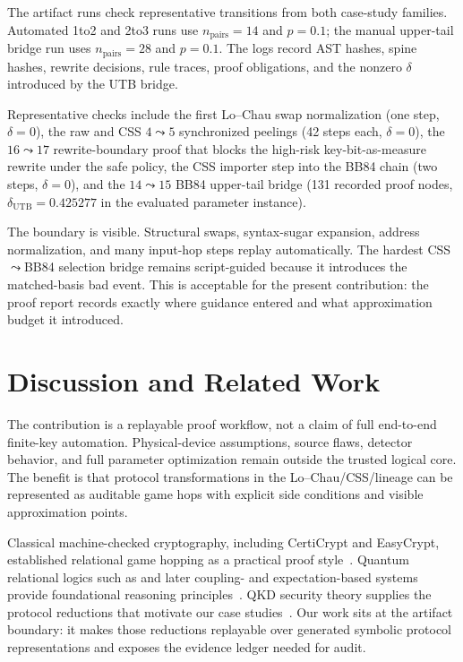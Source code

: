 The artifact runs check representative transitions from both case-study families. Automated 1to2 and 2to3 runs use $n_{\mathrm{pairs}}=14$ and $p=0.1$; the manual upper-tail bridge run uses $n_{\mathrm{pairs}}=28$ and $p=0.1$. The logs record AST hashes, spine hashes, rewrite decisions, rule traces, proof obligations, and the nonzero $\delta$ introduced by the UTB bridge.

Representative checks include the first Lo--Chau swap normalization (one step, $\delta=0$), the raw and CSS $4\leadsto5$ synchronized peelings (42 steps each, $\delta=0$), the $16\leadsto17$ rewrite-boundary proof that blocks the high-risk key-bit-as-measure rewrite under the safe policy, the CSS importer step into the BB84 chain (two steps, $\delta=0$), and the $14\leadsto15$ BB84 upper-tail bridge (131 recorded proof nodes, $\delta_{\mathrm{UTB}}=0.425277$ in the evaluated parameter instance).

The boundary is visible. Structural swaps, syntax-sugar expansion, address normalization, and many input-hop steps replay automatically. The hardest CSS$\leadsto$BB84 selection bridge remains script-guided because it introduces the matched-basis bad event. This is acceptable for the present contribution: the proof report records exactly where guidance entered and what approximation budget it introduced.

\section{Discussion and Related Work}

The contribution is a replayable proof workflow, not a claim of full end-to-end finite-key automation. Physical-device assumptions, source flaws, detector behavior, and full parameter optimization remain outside the trusted logical core. The benefit is that protocol transformations in the Lo--Chau/CSS/\bb lineage can be represented as auditable game hops with explicit side conditions and visible approximation points.

Classical machine-checked cryptography, including CertiCrypt and EasyCrypt, established relational game hopping as a practical proof style~\cite{barthe2009certicrypt,barthe2012easycrypt,barthe2009prhl,barthe2017probabilistic}. Quantum relational logics such as \qrhl and later coupling- and expectation-based systems provide foundational reasoning principles~\cite{unruh2019qrhl,barthe2019relationalq,li2021expectation,barthe2025complete}. QKD security theory supplies the protocol reductions that motivate our case studies~\cite{lochau1999unconditional,calderbank1996good,steane1996multiple,shor2000simple,mayers2001unconditional}. Our work sits at the artifact boundary: it makes those reductions replayable over generated symbolic protocol representations and exposes the evidence ledger needed for audit.

